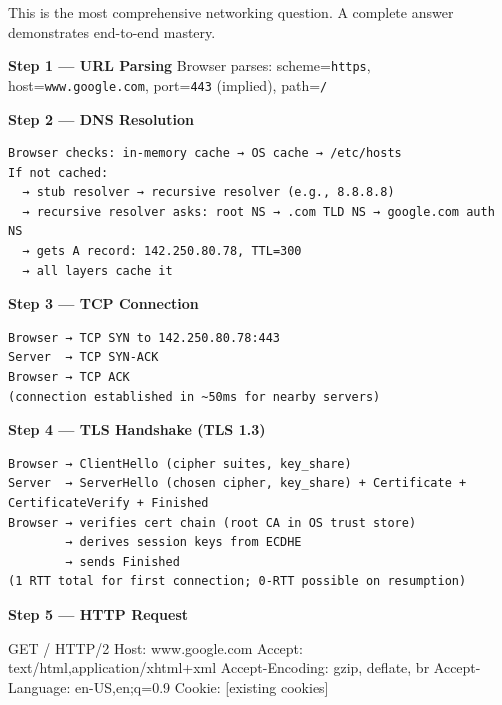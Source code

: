 \documentclass[11pt]{article}
\newenvironment{Shaded}{\begin{snugshade}}{\end{snugshade}}
\newcommand{\DecValTok}[1]{\textcolor[rgb]{0.96,0.45,0.00}{#1}}
\newcommand{\FloatTok}[1]{\textcolor[rgb]{0.96,0.45,0.00}{#1}}
\newcommand{\NormalTok}[1]{\textcolor[rgb]{0.81,0.81,0.76}{#1}}
\newcommand{\OperatorTok}[1]{\textcolor[rgb]{0.81,0.81,0.76}{#1}}
\begin{document}
This is the most comprehensive networking question. A complete answer demonstrates end-to-end mastery.

\textbf{Step 1 --- URL Parsing}
Browser parses: scheme=\texttt{https}, host=\texttt{www.google.com}, port=\texttt{443} (implied), path=\texttt{/}

\textbf{Step 2 --- DNS Resolution}

\setcodelang{}

\begin{verbatim}
Browser checks: in-memory cache → OS cache → /etc/hosts
If not cached:
  → stub resolver → recursive resolver (e.g., 8.8.8.8)
  → recursive resolver asks: root NS → .com TLD NS → google.com auth NS
  → gets A record: 142.250.80.78, TTL=300
  → all layers cache it
\end{verbatim}

\textbf{Step 3 --- TCP Connection}

\setcodelang{}

\begin{verbatim}
Browser → TCP SYN to 142.250.80.78:443
Server  → TCP SYN-ACK
Browser → TCP ACK
(connection established in ~50ms for nearby servers)
\end{verbatim}

\textbf{Step 4 --- TLS Handshake (TLS 1.3)}

\setcodelang{}

\begin{verbatim}
Browser → ClientHello (cipher suites, key_share)
Server  → ServerHello (chosen cipher, key_share) + Certificate + CertificateVerify + Finished
Browser → verifies cert chain (root CA in OS trust store)
        → derives session keys from ECDHE
        → sends Finished
(1 RTT total for first connection; 0-RTT possible on resumption)
\end{verbatim}

\textbf{Step 5 --- HTTP Request}


\begin{Shaded}
\begin{Highlighting}[]
\NormalTok{GET }\OperatorTok{/}\NormalTok{ HTTP}\OperatorTok{/}\DecValTok{2}
\NormalTok{Host: www.google.com}
\NormalTok{Accept: text}\OperatorTok{/}\NormalTok{html,application}\OperatorTok{/}\NormalTok{xhtml}\OperatorTok{+}\NormalTok{xml}
\NormalTok{Accept}\OperatorTok{{-}}\NormalTok{Encoding: gzip, deflate, br}
\NormalTok{Accept}\OperatorTok{{-}}\NormalTok{Language: en}\OperatorTok{{-}}\NormalTok{US,en}\OperatorTok{;}\NormalTok{q}\OperatorTok{=}\FloatTok{0.9}
\NormalTok{Cookie: [existing cookies]}
\end{Highlighting}
\end{Shaded}
\end{document}
